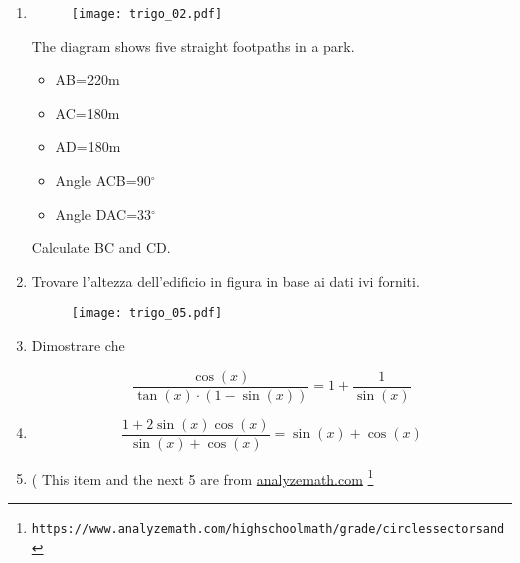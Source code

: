 \begin{enumerate} %

\item 

\begin{figure}[H]
\centering
\texttt{[image: trigo\_02.pdf]}
\end{figure}

The diagram shows five straight footpaths in a park.

\begin{itemize}
\item AB=220m
\item AC=180m
\item AD=180m
\item Angle ACB=90$^\circ$
\item Angle DAC=33$^\circ$
\end{itemize}

Calculate BC and CD.



\item 

Trovare l'altezza dell'edificio in figura in base ai dati ivi forniti.

\begin{figure}[H]
\centering
\texttt{[image: trigo\_05.pdf]}
\end{figure}


\item 

Dimostrare che 

\[
\frac{
\cos(x)
}{
\tan(x)\cdot\left(1-\sin(x)\right)
} = 1+\frac{1}{\sin(x)}
\]

\item 

\[
\frac{
1+2\sin(x)\cos(x)
}{
\sin(x)+\cos(x)
}
=
\sin(x)+\cos(x)
\]

\item
( This item and the next 5 are from 
\href{https://www.analyzemath.com/high\textunderscore school\textunderscore math/grade\textunderscore 12/circles\textunderscore sectors\textunderscore and\textunderscore trigonometry\textunderscore problems.html}{analyzemath.com}
\footnote{\texttt{https://www.analyzemath.com/high\textunderscore school\textunderscore math/grade/circles\textunderscore sectors\textunderscore and\textunderscore}

}
\end{enumerate}
